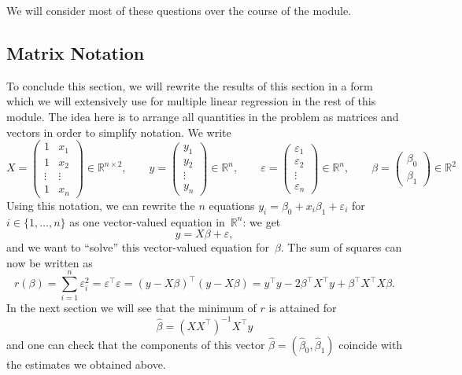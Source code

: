 \documentclass[
  a4paper,
]{article}
\theoremstyle{definition}
\theoremstyle{definition}
\theoremstyle{definition}
\theoremstyle{definition}
\theoremstyle{remark}
\begin{document}
We will consider most of these questions over the course of the
module.

\hypertarget{sec:simple-mat}{%
\subsection{Matrix Notation}\label{sec:simple-mat}}

To conclude this section, we will rewrite the results of this section
in a form which we will extensively use for multiple linear regression
in the rest of this module. The idea here is to arrange all quantities
in the problem as matrices and vectors in order to simplify notation.
We write
\begin{equation*}
  X = \begin{pmatrix}
    1 & x_1\\ 1 & x_2\\\vdots & \vdots\\1 & x_n
  \end{pmatrix}
  \in \mathbb{R}^{n\times 2},
  \qquad
  y = \begin{pmatrix}
    y_1 \\ y_2 \\ \vdots \\ y_n
  \end{pmatrix}
  \in \mathbb{R}^n,
  \qquad
  \varepsilon= \begin{pmatrix}
    \varepsilon_1 \\ \varepsilon_2 \\ \vdots \\ \varepsilon_n
  \end{pmatrix}
  \in \mathbb{R}^n,
  \qquad
  \beta = \begin{pmatrix}
    \beta_0 \\
    \beta_1
  \end{pmatrix}
  \in\mathbb{R}^2
\end{equation*}
Using this notation, we can rewrite the \(n\) equations \(y_i = \beta_0 + x_i \beta_1 + \varepsilon_i\) for \(i \in \{1, \ldots, n\}\) as one
vector-valued equation in~\(\mathbb{R}^n\): we get
\begin{equation*}
  y = X\beta + \varepsilon,
\end{equation*}
and we want to ``solve'' this vector-valued equation for~\(\beta\).
The sum of squares can now be written as
\begin{equation*}
  r(\beta)
  = \sum_{i=1}^n \varepsilon_i^2
  = \varepsilon^\top \varepsilon
  = (y - X\beta)^\top (y - X\beta)
  = y^\top y - 2\beta^\top X^\top y + \beta^\top X^\top X \beta.
\end{equation*}
In the next section we will see that the minimum of \(r\) is attained
for
\begin{equation*}
  \hat\beta
  = (X X^\top)^{-1} X^\top y
\end{equation*}
and one can check that the components of this vector \(\hat\beta = (\hat\beta_0, \hat\beta_1)\) coincide with the estimates we obtained above.
\end{document}
